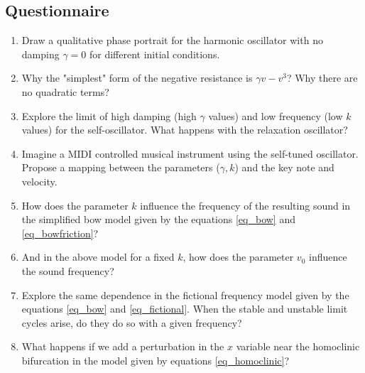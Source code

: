 \documentclass{article}
\begin{document}
\subsection{Questionnaire}
\begin{enumerate}
\item Draw a qualitative phase portrait for the harmonic oscillator with no damping $\gamma=0$ for different initial conditions.
\item Why the "simplest" form of the negative resistance is $\gamma v - v^3$? Why there are no quadratic terms?
\item Explore the limit of high damping (high $\gamma$ values) and low frequency (low $k$ values) for the self-oscillator. What happens with the relaxation oscillator?
\item Imagine a MIDI controlled musical instrument using the self-tuned oscillator. Propose a mapping between the parameters ($\gamma,k$) and the key note and velocity. 
\item How does the parameter $k$ influence the frequency of the resulting sound in the simplified bow model given by the equations \ref{eq_bow} and \ref{eq_bowfriction}? 
\item And in the above model for a fixed $k$, how does the parameter $v_0$ influence the sound frequency?
\item Explore the same dependence in the fictional frequency model given by the equations \ref{eq_bow} and \ref{eq_fictional}. When the stable and unstable limit cycles arise, do they do so with a given frequency?
\item What happens if we add a perturbation in the $x$ variable near the homoclinic bifurcation in the model given by equations \ref{eq_homoclinic}?
\end{enumerate}
\end{document}
